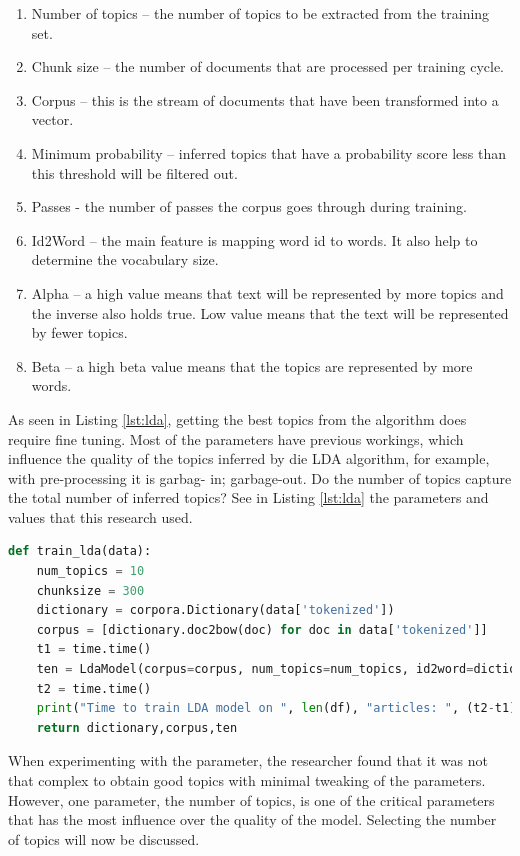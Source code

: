 \begin{enumerate}
    \item Number of topics – the number of topics to be extracted from the training set.
    \item Chunk size – the number of documents that are processed per training cycle.
    \item Corpus – this is the stream of documents that have been transformed into a vector.
    \item Minimum probability – inferred topics that have a probability score less than this threshold will be filtered out.
    \item Passes - the number of passes the corpus goes through during training.
    \item Id2Word – the main feature is mapping word id to words. It also help to determine the vocabulary size.
    \item Alpha – a high value means that text will be represented by more topics and the inverse also holds true. Low value means that the text will be represented by fewer topics.
    \item Beta – a high beta value means that the topics are represented by more words.
   
\end{enumerate}

As seen in Listing \ref{lst:lda}, getting the best topics from the algorithm does require fine tuning. Most of the parameters have previous workings, which influence the quality of the topics inferred by die LDA algorithm, for example, with pre-processing it is garbag- in; garbage-out. Do the number of topics capture the total number of inferred topics? See in Listing \ref{lst:lda} the parameters and values that this research used.

\begin{lstlisting}[language=Python, label={lst:lda}, caption=LDA Parameters]
def train_lda(data):
    num_topics = 10
    chunksize = 300
    dictionary = corpora.Dictionary(data['tokenized'])
    corpus = [dictionary.doc2bow(doc) for doc in data['tokenized']]
    t1 = time.time()
    ten = LdaModel(corpus=corpus, num_topics=num_topics, id2word=dictionary, chunksize=chunksize, minimum_probability=0.0,iterations=100)
    t2 = time.time()
    print("Time to train LDA model on ", len(df), "articles: ", (t2-t1)/60, "min")
    return dictionary,corpus,ten
\end{lstlisting}

When experimenting with the parameter, the researcher found that it was not that complex to obtain good topics with minimal tweaking of the parameters. However,  one parameter, the number of topics, is one of the critical parameters that has the most influence over the quality of the model. Selecting the number of topics will now be discussed.


